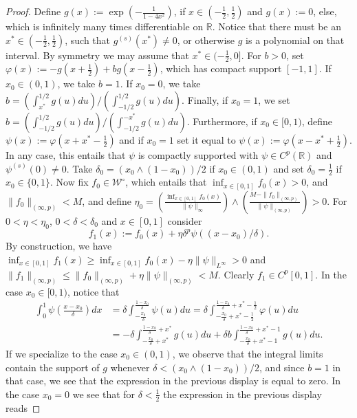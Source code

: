 \documentclass[10pt,a4paper]{amsart}
\newcommand{\R}{{\mathbb R}}
\begin{document}
\begin{proof}
    Define $g(x):= \exp\left(-\frac{1}{1-4x^2} \right)$,  if $x\in(-\frac12,\frac12)$ and $g(x) := 0$, else, which is infinitely many times differentiable on $\R$. Notice that there must be an $x^*\in(-\frac12,\frac12)$, such that $g^{(s)}(x^*)\neq 0$, or otherwise $g$ is a polynomial on that interval. By symmetry we may assume that $x^*\in(-\frac12,0]$. For $b>0$, set $\varphi(x) := -g(x+\frac12) + bg(x-\frac12)$, which has compact support $[-1,1]$. If $x_0\in(0,1)$, we take $b=1$. If $x_0=0$, we take $b=(\int_{x^*}^{1/2}g(u)du )/(\int_{-1/2}^{1/2} g(u)du )$. Finally, if $x_0=1$, we set $b=(\int_{-1/2}^{1/2} g(u)du )/(\int_{-1/2}^{-x^*}g(u)du )$. Furthermore, if $x_0\in[0,1)$, define $\psi(x) := \varphi(x+x^*-\frac12)$ and if $x_0=1$ set it equal to $\psi(x) := \varphi(x-x^*+\frac12)$. 
    In any case, this entails that $\psi$ is compactly supported with $\psi\in C^p(\R)$ and $\psi^{(s)}(0) \neq 0$. Take $\delta_0=(x_0\land(1-x_0))/2$ if $x_0\in(0,1)$ and set $\delta_0=\frac12$ if $x_0\in\{0,1\}$. Now fix $f_0\in \mathcal W^\circ$, which entails that $\inf_{x\in[0,1]}f_0(x)>0$, and $\|f_0\|_{(\infty,p)}<M$, and define $\eta_0 = \left(\frac{\inf_{x\in[0,1]}f_0(x)}{\|\psi\|_\infty} \right)\land\left( \frac{M-\|f_0\|_{(\infty,p)}}{\|\psi\|_{(\infty,p)}}\right)>0$. For $0<\eta<\eta_0$, $0<\delta<\delta_0$ and $x\in[0,1]$ consider 
    $$
    f_1(x) := f_0(x) + \eta\delta^p\psi((x-x_0)/\delta).
    $$
    By construction, we have $\inf_{x\in[0,1]}f_1(x)\ge \inf_{x\in[0,1]}f_0(x) - \eta\|\psi\|_{L^\infty}>0$ and $\|f_1\|_{(\infty,p)} \le \|f_0\|_{(\infty,p)} + \eta\|\psi\|_{(\infty,p)} < M$. Clearly $f_1\in C^p[0,1]$. In the case $x_0\in[0,1)$, notice that
    \begin{align*}
        \int_0^1 \psi\left( \frac{x-x_0}{\delta}\right)dx
        &=\delta \int_{-\frac{x_0}{\delta}}^{\frac{1-x_0}{\delta}} \psi(u)du
        =\delta
        \int_{-\frac{x_0}{\delta}+x^*-\frac12}^{\frac{1-x_0}{\delta}+x^*-\frac12} \varphi(u)du\\
        &=
        -\delta \int_{-\frac{x_0}{\delta}+x^*}^{\frac{1-x_0}{\delta}+x^*}g(u)du + \delta b \int_{-\frac{x_0}{\delta}+x^*-1}^{\frac{1-x_0}{\delta}+x^*-1}g(u)du.
    \end{align*}
    If we specialize to the case $x_0\in(0,1)$, we observe that the integral limits contain the support of $g$ whenever $\delta<(x_0\land(1-x_0))/2$, and since $b=1$ in that case, we see that the expression in the previous display is equal to zero. In the case $x_0=0$ we see that for $\delta<\frac12$ the expression in the previous display reads

\end{proof}
\end{document}
